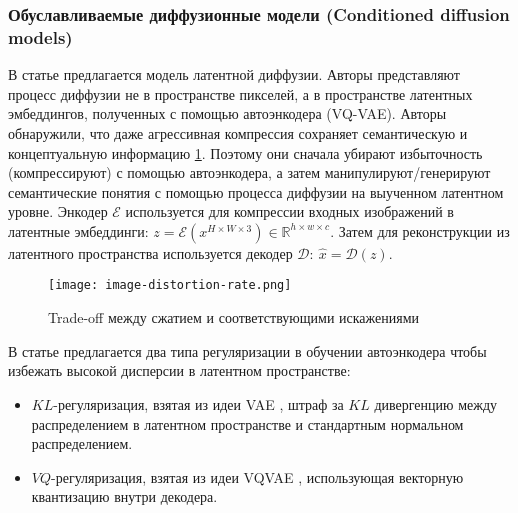 





\par



\subsubsection{Обуславливаемые диффузионные модели (Conditioned diffusion models)}
\par

В статье \cite{rombach2022highresolution} предлагается модель латентной диффузии. Авторы представляют процесс диффузии не в пространстве пикселей, а в пространстве латентных эмбеддингов, полученных с помощью автоэнкодера (VQ-VAE). Авторы обнаружили, что даже агрессивная компрессия сохраняет семантическую и концептуальную информацию \ref{fig:image-distortion-rate}. Поэтому они сначала убирают избыточность (компрессируют) с помощью автоэнкодера, а затем манипулируют/генерируют семантические понятия с помощью процесса диффузии на выученном латентном уровне. Энкодер $\mathcal{E}$ используется для компрессии входных изображений в латентные эмбеддинги: $z = \mathcal{E}(x^{H\times W\times 3}) \in \mathbb{R}^{h\times w\times c}$. Затем для реконструкции из латентного пространства используется декодер $\mathcal{D}:\ \hat{x} = \mathcal{D}(z)$.
\begin{figure}[H]
    \centering
    \texttt{[image: image-distortion-rate.png]}
    \caption{Trade-off между сжатием и соответствующими искажениями \cite{rombach2022highresolution}}
    \label{fig:image-distortion-rate}
\end{figure} 

В статье предлагается два типа регуляризации в обучении автоэнкодера чтобы избежать высокой дисперсии в латентном пространстве:
\begin{itemize}
    \item $KL$-регуляризация, взятая из идеи VAE \cite{Kingma_2019}, штраф за $KL$ дивергенцию между распределением в латентном пространстве и стандартным нормальном распределением.
    \item $VQ$-регуляризация, взятая из идеи VQVAE \cite{oord2018neural}, использующая векторную квантизацию внутри декодера.
\end{itemize}

